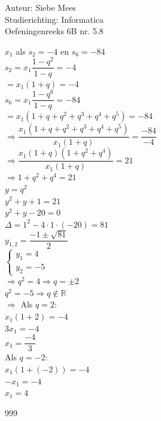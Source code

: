\documentclass[a4paper]{article}
\begin{document}
  
\noindent \large Auteur: Siebe Mees \\
\noindent \large Studierichting: Informatica\\
\noindent \large Oefeningenreeks 6B nr. 5.8\\

\medskip

\normalsize

$x_1 $ als $ s_2 = -4 $ en $ s_6 = -84$\\

$s_2 = x_1 \dfrac{1-q^2}{1-q} = -4 $\\

$= x_1(1+q) = -4 $\\

$ s_6 = x_1 \dfrac{1-q^6}{1-q} = -84 $\\

$ = x_1(1+q+q^2+q^3+q^4+q^5) = -84$\\

$\Rightarrow \dfrac{x_1(1+q+q^2+q^3+q^4+q^5)}{x_1(1+q)} = \dfrac{-84}{-4}$\\

$\Rightarrow \dfrac{x_1(1+q)(1+q^2+q^4)}{x_1(1+q)} = 21$\\

$\Rightarrow 1+q^2+q^4 = 21$\\

$y = q^2$\\

$y^2 + y + 1 = 21$\\

$y^2 + y - 20 = 0$\\

$\Delta = 1^2 - 4 \cdot 1 \cdot (-20) = 81$\\

$y_{1,2} = \dfrac{-1 \pm \sqrt{81}}{2}$\\

$\left \{
\begin{array}{l}
y_1 = 4 \\

y_2 = -5
\end{array}
\right .$\\

$\Rightarrow q^2 = 4 \Rightarrow q = \pm 2$\\

$q^2 = -5 \Rightarrow q \notin \mathbb{R}$\\

$\Rightarrow $ Als $ q = 2: $\\

$x_1(1+2) = -4$\\

$3x_1 = -4$\\

$x_1 = \dfrac{-4}{3}$\\

Als $ q = -2: $\\

$x_1(1+(-2)) = -4$\\

$-x_1 = -4$\\

$x_1 = 4$\\

\begin{thebibliography}{999}
\end{thebibliography}
\end{document}
